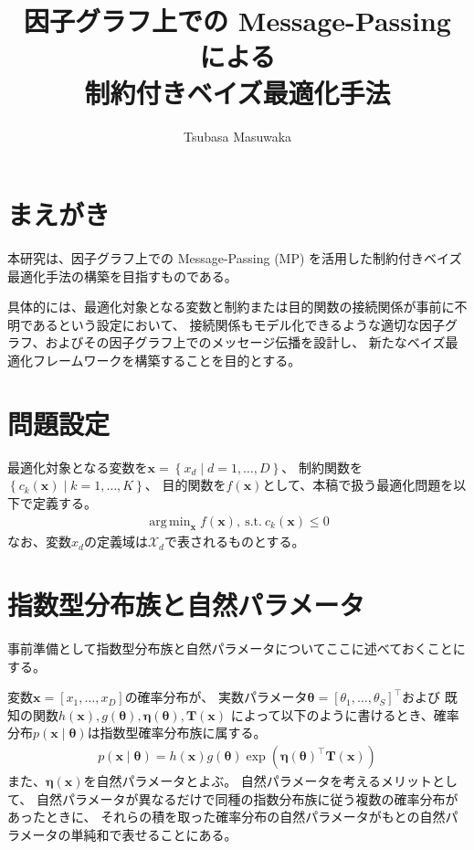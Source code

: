 \documentclass[oneside,onecolumn]{jlreq}
\title{因子グラフ上での Message-Passing による\\制約付きベイズ最適化手法}
\author{Tsubasa Masuwaka}
\date{}
\DeclareMathOperator*{\argmin}{arg\,min}
\theoremstyle{plain}
\begin{document}
\maketitle

\section{まえがき}

本研究は、因子グラフ上での Message-Passing (MP) を活用した制約付きベイズ最適化手法の構築を目指すものである。

具体的には、最適化対象となる変数と制約または目的関数の接続関係が事前に不明であるという設定において、
接続関係もモデル化できるような適切な因子グラフ、およびその因子グラフ上でのメッセージ伝播を設計し、
新たなベイズ最適化フレームワークを構築することを目的とする。

\section{問題設定}
最適化対象となる変数を$\bm{x}=\left\{x_d\mid d=1,\ldots,D\right\}$、
制約関数を$\left\{c_k\left(\bm{x}\right)\mid k=1,\ldots,K\right\}$、
目的関数を$f(\bm{x})$として、本稿で扱う最適化問題を以下で定義する。
\begin{align}
    \argmin_{\bm{x}} f\left(\bm{x}\right),~\textrm{s.t.}~c_k\left(\bm{x}\right)\leq 0
\end{align}
なお、変数$x_d$の定義域は$\mathcal{X}_d$で表されるものとする。

\section{指数型分布族と自然パラメータ}
事前準備として指数型分布族と自然パラメータについてここに述べておくことにする。

変数$\bm{x}=\left[x_1,\ldots,x_D\right]$の確率分布が、
実数パラメータ$\bm{\theta}=\left[\theta_1,\ldots,\theta_S\right]^\top$および
既知の関数$h\left(\bm{x}\right), g\left(\bm{\theta}\right), \bm{\eta}\left(\bm{\theta}\right), \bm{T}\left(\bm{x}\right)$
によって以下のように書けるとき、確率分布$p\left(\bm{x}\mid\bm{\theta}\right)$は指数型確率分布族に属する。
\begin{align}
    p\left(\bm{x}\mid \bm{\theta}\right) = h\left(\bm{x}\right)g\left(\bm{\theta}\right)\exp\left(\bm{\eta}\left(\bm{\theta}\right)^\top\bm{T}\left(\bm{x}\right)\right)
\end{align}
また、$\bm{\eta}\left(\bm{x}\right)$を自然パラメータとよぶ。
自然パラメータを考えるメリットとして、
自然パラメータが異なるだけで同種の指数分布族に従う複数の確率分布があったときに、
それらの積を取った確率分布の自然パラメータがもとの自然パラメータの単純和で表せることにある。
\end{document}
